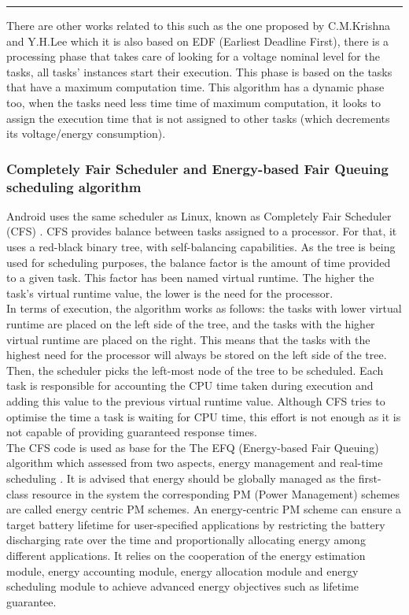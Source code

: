 \documentclass[conference]{IEEEtran}
\begin{document}
\noindent\rule{8cm}{0.4pt}

There are other works related to this such as the one proposed by C.M.Krishna and Y.H.Lee \cite{KRISH01} which it is also based on EDF (Earliest Deadline First), there is a processing phase that takes care of looking for a voltage nominal level for the tasks, all tasks' instances start their execution. This phase is based on the tasks that have a maximum computation time. This algorithm has a dynamic phase too, when the tasks need less time time of maximum computation, it looks to assign the execution time that is not assigned to other tasks (which decrements its voltage/energy consumption). 

\subsubsection{Completely Fair Scheduler and Energy-based Fair Queuing scheduling algorithm}

Android uses the same scheduler as Linux, known as Completely Fair Scheduler (CFS) \cite{ANDR01}. CFS provides balance between tasks assigned to a processor. For that, it uses a red-black binary tree,  with self-balancing capabilities.  As the tree is being used for scheduling purposes, the balance factor is the amount of time provided to a given task. This
factor has been named virtual runtime. The higher the task’s virtual runtime value, the lower is the need for the processor.\\
In terms of execution, the algorithm works as follows: the tasks with lower virtual runtime are placed on the left side of the tree, and the tasks with the higher virtual runtime are placed on the right. This means that the tasks with the highest need for the processor will always be  stored on the left side of the tree. Then, the scheduler picks the left-most
node of the tree to be scheduled. Each task is responsible for accounting the CPU time taken during execution and adding this value to the previous virtual runtime value. Although CFS tries to optimise the time a task is waiting for CPU time, this effort is not enough as it is not capable of providing guaranteed response times. \\

The CFS code is used as base for the The EFQ (Energy-based Fair Queuing) algorithm which assessed from two aspects, energy management and real-time scheduling \cite{WEI01}. 
It is advised that energy should be globally managed as the first-class resource in the system  the corresponding PM (Power Management) schemes are called energy centric PM schemes. An energy-centric PM scheme can ensure a target battery lifetime for user-specified applications by restricting the battery discharging rate over the time and proportionally allocating energy among different applications.  It relies on the cooperation of the energy estimation module, energy accounting module, energy allocation module and energy scheduling module to achieve advanced energy objectives such as lifetime guarantee.\\
\end{document}
